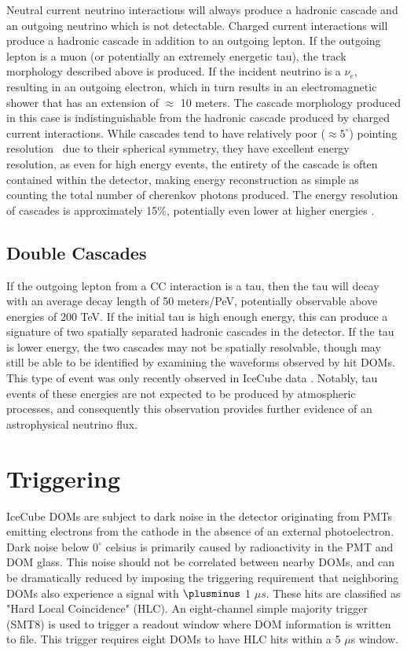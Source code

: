 \color{red} Neutral current neutrino interactions will always produce a hadronic cascade and an outgoing neutrino which is not detectable. Charged current interactions will produce a hadronic cascade in addition to an outgoing lepton. If the outgoing lepton is a muon (or potentially an extremely energetic tau), the track morphology described above is produced. If the incident neutrino is a $\nu_e$, resulting in an outgoing electron, which in turn results in an electromagnetic shower that has an extension of $\approx$ 10 meters. The cascade morphology produced in this case is indistinguishable from the hadronic cascade produced by charged current interactions. While cascades tend to have relatively poor ($\approx 5^{\circ}$) pointing resolution~\cite{cascade_dnn_paper}\color{black} due to their spherical symmetry, they have excellent energy resolution, as even for high energy events, the entirety of the cascade is often contained within the detector, making energy reconstruction as simple as counting the total number of cherenkov photons produced. The energy resolution of cascades is approximately 15\%, potentially even lower at higher energies \cite{AustinThesis}.


\subsection{Double Cascades}
If the outgoing lepton from a CC interaction is a tau, then the tau will decay with an average decay length of 50 meters/PeV, potentially observable above energies of 200 TeV. If the initial tau is high enough energy, this can produce a signature of two spatially separated hadronic cascades in the detector. If the tau is lower energy, the two cascades may not be spatially resolvable, though may still be able to be identified by examining the waveforms observed by hit DOMs. This type of event was only recently observed in IceCube data \cite{taupaper}. Notably, tau events of these energies are not expected to be produced by atmospheric processes, and consequently this observation provides further evidence of an astrophysical neutrino flux. 

\section{Triggering}
IceCube DOMs are subject to dark noise in the detector originating from PMTs emitting electrons from the cathode in the absence of an external photoelectron. Dark noise below $0^{\circ}$ celsius is primarily caused by radioactivity in the PMT and DOM glass. This noise should not be correlated between nearby DOMs, and can be dramatically reduced by imposing the triggering requirement that neighboring DOMs also experience a signal with $\plusminus$ 1 $\mu s$. These hits are classified as "Hard Local Coincidence" (HLC). An eight-channel simple majority trigger (SMT8) is used to trigger a readout window where DOM information is written to file. This trigger requires eight DOMs to have HLC hits within a 5 $\mu$s window. 

